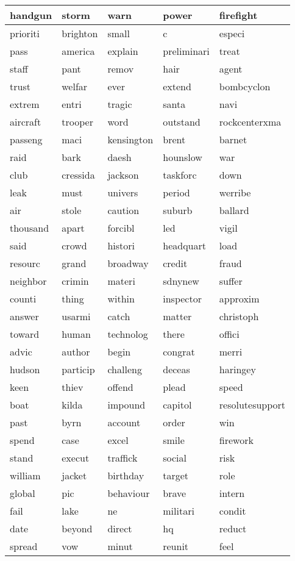 \begin{longtable}{p{2.5cm}p{2.5cm}p{2.5cm}p{2.5cm}p{2.5cm}}
handgun&storm&warn&power&firefight\\ \hline 
prioriti&brighton&small&c&especi\\ \hline 
pass&america&explain&preliminari&treat\\ \hline 
staff&pant&remov&hair&agent\\ \hline 
trust&welfar&ever&extend&bombcyclon\\ \hline 
extrem&entri&tragic&santa&navi\\ \hline 
aircraft&trooper&word&outstand&rockcenterxma\\ \hline 
passeng&maci&kensington&brent&barnet\\ \hline 
raid&bark&daesh&hounslow&war\\ \hline 
club&cressida&jackson&taskforc&down\\ \hline 
leak&must&univers&period&werribe\\ \hline 
air&stole&caution&suburb&ballard\\ \hline 
thousand&apart&forcibl&led&vigil\\ \hline 
said&crowd&histori&headquart&load\\ \hline 
resourc&grand&broadway&credit&fraud\\ \hline 
neighbor&crimin&materi&sdnynew&suffer\\ \hline 
counti&thing&within&inspector&approxim\\ \hline 
answer&usarmi&catch&matter&christoph\\ \hline 
toward&human&technolog&there&offici\\ \hline 
advic&author&begin&congrat&merri\\ \hline 
hudson&particip&challeng&deceas&haringey\\ \hline 
keen&thiev&offend&plead&speed\\ \hline 
boat&kilda&impound&capitol&resolutesupport\\ \hline 
past&byrn&account&order&win\\ \hline 
spend&case&excel&smile&firework\\ \hline 
stand&execut&traffick&social&risk\\ \hline 
william&jacket&birthday&target&role\\ \hline 
global&pic&behaviour&brave&intern\\ \hline 
fail&lake&ne&militari&condit\\ \hline 
date&beyond&direct&hq&reduct\\ \hline 
spread&vow&minut&reunit&feel\\ \hline 

\end{longtable}
